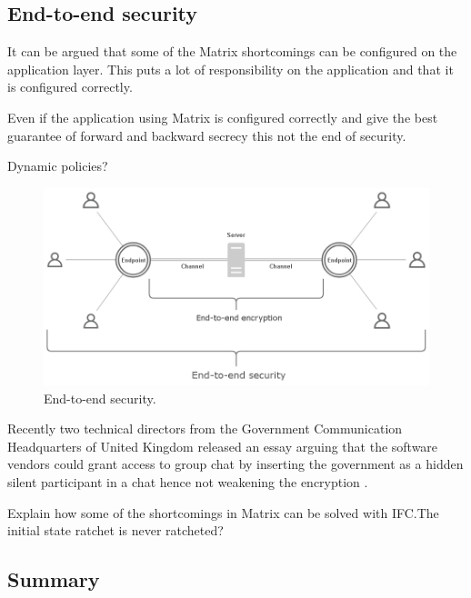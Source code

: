 \subsection{End-to-end security}
It can be argued that some of the Matrix shortcomings can be configured on the application layer. This puts a lot of responsibility on the application and that it is configured correctly. 

Even if the application using Matrix is configured correctly and give the best guarantee of forward and backward secrecy this not the end of security. 

Dynamic policies?


\begin{figure}[H]
	\centering
	\includegraphics[width=12cm]{figures/e2esecurity.png}
	\caption{End-to-end security.}
	\label{fig:e2esecurity}
\end{figure}


Recently two technical directors from the Government Communication Headquarters of United Kingdom released an essay arguing that the software vendors could grant access to group chat by inserting the government as a hidden silent participant in a chat hence not weakening the encryption \cite{gchq}.


Explain how some of the shortcomings in Matrix can be solved with IFC.The initial state ratchet is never ratcheted?

\subsection{Summary}








